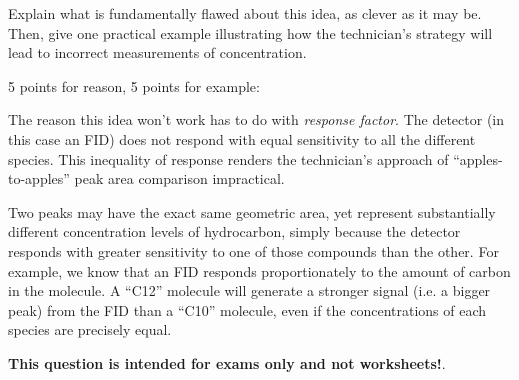 \vskip 10pt

Explain what is fundamentally flawed about this idea, as clever as it may be.  Then, give one practical example illustrating how the technician's strategy will lead to incorrect measurements of concentration.







5 points for reason, 5 points for example:
 
\vskip 10pt

The reason this idea won't work has to do with {\it response factor}.  The detector (in this case an FID) does not respond with equal sensitivity to all the different species.  This inequality of response renders the technician's approach of ``apples-to-apples'' peak area comparison impractical.

\vskip 10pt

Two peaks may have the exact same geometric area, yet represent substantially different concentration levels of hydrocarbon, simply because the detector responds with greater sensitivity to one of those compounds than the other.  For example, we know that an FID responds proportionately to the amount of carbon in the molecule.  A ``C12'' molecule will generate a stronger signal (i.e. a bigger peak) from the FID than a ``C10'' molecule, even if the concentrations of each species are precisely equal.







{\bf This question is intended for exams only and not worksheets!}.



